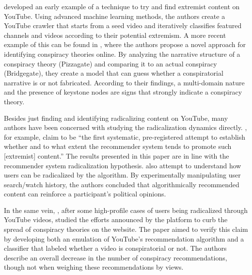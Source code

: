 \citet{agarwal_topic-specific_2015} developed an early example of a technique to
try and find extremist content on YouTube. Using advanced machine learning
methods, the authors create a YouTube crawler that starts from a seed video and
iteratively classifies featured channels and videos according to their potential
extremism. A more recent example of this can be found in
\citet{tangherlini_automated_2020}, where the authors propose a novel approach
for identifying conspiracy theories online. By analyzing the narrative structure
of a conspiracy theory (Pizzagate) and comparing it to an actual conspiracy
(Bridgegate), they create a model that can guess whether a conspiratorial
narrative is or not fabricated. According to their findings, a multi-domain
nature and the presence of keystone nodes are signs that strongly indicate a
conspiracy theory.

Besides just finding and identifying radicalizing content on YouTube, many
authors have been concerned with studying the radicalization dynamics directly.
\citet{alfano_technologically_2020}, for example, claim to be ``the first
systematic, pre-registered attempt to establish whether and to what extent the
recommender system tends to promote such [extremist] content.'' The results
presented in this paper are in line with the recommender system radicalization
hypothesis. \citet{cho_search_2020} also attempt to understand how users can be
radicalized by the algorithm. By experimentally manipulating user search/watch
history, the authors concluded that algorithmically recommended content can
reinforce a participant's political opinions.

In the same vein, \citet{faddoul_longitudinal_2020}, after some high-profile
cases of users being radicalized through YouTube videos, studied the efforts
announced by the platform to curb the spread of conspiracy theories on the
website. The paper aimed to verify this claim by developing both an emulation of
YouTube's recommendation algorithm and a classifier that labeled whether a video
is conspiratorial or not. The authors describe an overall decrease in the number
of conspiracy recommendations, though not when weighing these recommendations by
views.

